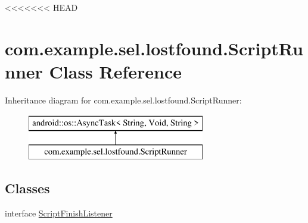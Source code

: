 <<<<<<< HEAD
\hypertarget{classcom_1_1example_1_1sel_1_1lostfound_1_1ScriptRunner}{\section{com.\-example.\-sel.\-lostfound.\-Script\-Runner Class Reference}
\label{classcom_1_1example_1_1sel_1_1lostfound_1_1ScriptRunner}
}
Inheritance diagram for com.\-example.\-sel.\-lostfound.\-Script\-Runner\-:\begin{figure}[H]
\begin{center}
\leavevmode
\includegraphics[height=2.000000cm]{classcom_1_1example_1_1sel_1_1lostfound_1_1ScriptRunner}
\end{center}
\end{figure}
\subsection*{Classes}
\begin{DoxyCompactItemize}
\item 
interface \hyperlink{interfacecom_1_1example_1_1sel_1_1lostfound_1_1ScriptRunner_1_1ScriptFinishListener}{Script\-Finish\-Listener}
\end{DoxyCompactItemize}
